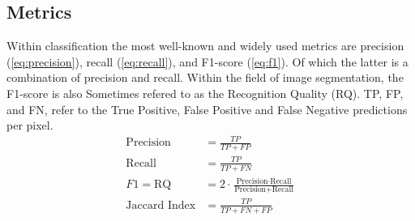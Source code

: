 \subsection{Metrics}
Within classification the most well-known and widely used metrics are precision (\ref{eq:precision}), recall (\ref{eq:recall}), and F1-score (\ref{eq:f1})\cite{rijsbergen1979information}. Of which the latter is a combination of precision and recall. Within the field of image segmentation, the F1-score is also Sometimes refered to as the Recognition Quality (RQ). TP, FP, and FN, refer to the True Positive, False Positive and False Negative predictions per pixel.
\begin{subequations}
    \begin{align}
        \text{Precision}     & = \frac{TP}{TP + FP} \label{eq:precision}                                                            \\
        \text{Recall}        & = \frac{TP}{TP + FN} \label{eq:recall}                                                               \\
        F1 = \text{RQ}       & = 2 \cdot \frac{\text{Precision} \cdot \text{Recall}}{\text{Precision} + \text{Recall}}\label{eq:f1} \\
        \text{Jaccard Index} & = \frac{TP}{TP + FN + FP} \label{eq:jaccard}                                                         \\
    \end{align}
\end{subequations}
